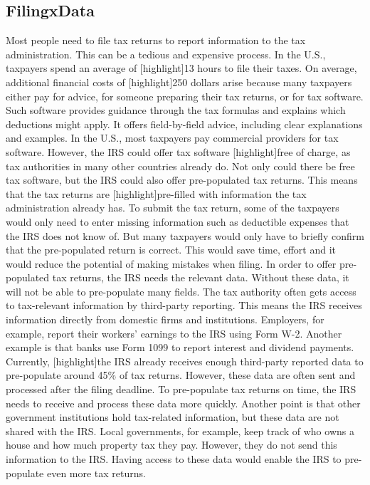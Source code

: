 \documentclass[11pt]{article}
\begin{document}
\subsection{FilingxData}
Most people need to file tax returns to report information to the tax administration. This can be a tedious and expensive process. In the U.S., taxpayers spend an average of [highlight]13 hours to file their taxes. On average, additional financial costs of [highlight]250 dollars arise because many taxpayers either pay for advice, for someone preparing their tax returns, or for tax software. Such software provides guidance through the tax formulas and explains which deductions might apply. It offers field-by-field advice, including clear explanations and examples. 
In the U.S., most taxpayers pay commercial providers for tax software. However, the IRS could offer tax software [highlight]free of charge, as tax authorities in many other countries already do. Not only could there be free tax software, but the IRS could also offer pre-populated tax returns. This means that the tax returns are [highlight]pre-filled with information the tax administration already has. To submit the tax return, some of the taxpayers would only need to enter missing information such as deductible expenses that the IRS does not know of. But many taxpayers would only have to briefly confirm that the pre-populated return is correct. This would save time, effort and it would reduce the potential of making mistakes when filing.
In order to offer pre-populated tax returns, the IRS needs the relevant data. Without these data, it will not be able to pre-populate many fields. 
The tax authority often gets access to tax-relevant information by third-party reporting. This means the IRS receives information directly from domestic firms and institutions. Employers, for example, report their workers’ earnings to the IRS using Form W-2.  Another example is that banks use Form 1099 to report interest and dividend payments. 
Currently, [highlight]the IRS already receives enough third-party reported data to pre-populate around 45\% of tax returns. However, these data are often sent and processed after the filing deadline. To pre-populate tax returns on time, the IRS needs to receive and process these data more quickly. Another point is that other government institutions hold tax-related information, but these data are not shared with the IRS. Local governments, for example, keep track of who owns a house and how much property tax they pay. However, they do not send this information to the IRS. Having access to these data would enable the IRS to pre-populate even more tax returns. 
\end{document}
